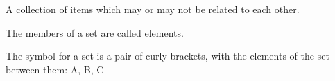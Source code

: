 A collection of items which may or may not be related to each other.
\par
The members of a set are called elements.
\par
The symbol for a set is a pair of curly brackets, with the
elements of the set between them:  {A, B, C}